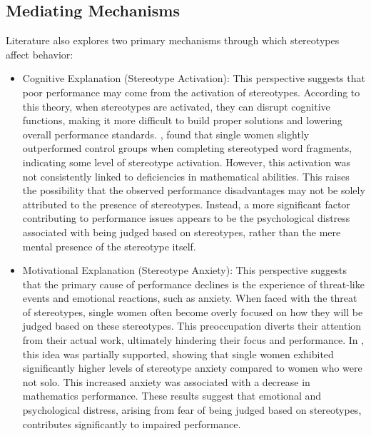 \subsection{Mediating Mechanisms}
Literature also explores two primary mechanisms through which stereotypes affect behavior:
\begin{itemize}
    \item Cognitive Explanation (Stereotype Activation): This perspective suggests that poor performance may come from the activation of stereotypes. According to this theory, when stereotypes are activated, they can disrupt cognitive functions, making it more difficult to build proper solutions and lowering overall performance standards. \textcite{Beat}, found that single women slightly outperformed control groups when completing stereotyped word fragments, indicating some level of stereotype activation. However, this activation was not consistently linked to deficiencies in mathematical abilities. This raises the possibility that the observed performance disadvantages may not be solely attributed to the presence of stereotypes. Instead, a more significant factor contributing to performance issues appears to be the psychological distress associated with being judged based on stereotypes, rather than the mere mental presence of the stereotype itself.
    \item Motivational Explanation (Stereotype Anxiety): This perspective suggests that the primary cause of performance declines is the experience of threat-like events and emotional reactions, such as anxiety. When faced with the threat of stereotypes, single women often become overly focused on how they will be judged based on these stereotypes. This preoccupation diverts their attention from their actual work, ultimately hindering their focus and performance. In \textcite{Beat}, this idea was partially supported, showing that single women exhibited significantly higher levels of stereotype anxiety compared to women who were not solo. This increased anxiety was associated with a decrease in mathematics performance. These results suggest that emotional and psychological distress, arising from fear of being judged based on stereotypes, contributes significantly to impaired performance.
\end{itemize}

